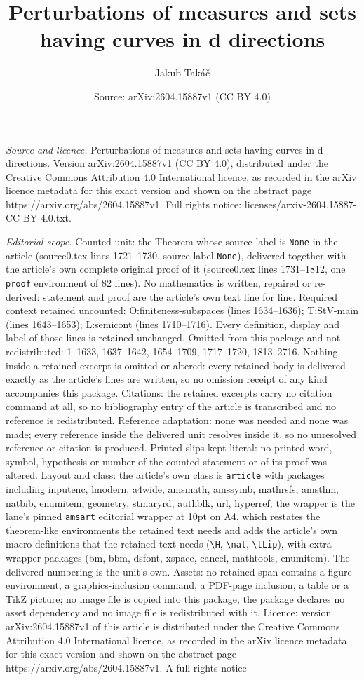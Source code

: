 \documentclass[10pt,a4paper]{amsart}
\title[Perturbations of measures and sets having curves in d direct]{Perturbations of measures and sets having curves in d directions}
\author{Jakub Tak\'a\v{c}}
\date{Source: arXiv:2604.15887v1 (CC BY 4.0)}
\begin{document}
\maketitle

\noindent\emph{Source and licence.} Perturbations of measures and sets having curves in d directions. Version arXiv:2604.15887v1 (CC BY 4.0), distributed under the Creative Commons Attribution 4.0 International licence, as recorded in the arXiv licence metadata for this exact version and shown on the abstract page https://arxiv.org/abs/2604.15887v1. Full rights notice: licenses/arxiv-2604.15887-CC-BY-4.0.txt.\par\smallskip

\noindent\textit{Editorial scope.} Counted unit: the Theorem whose source label is \texttt{None} in the article (source0.tex lines 1721--1730, source label \texttt{None}), delivered together with the article's own complete original proof of it (source0.tex lines 1731--1812, one \texttt{proof} environment of 82 lines). No mathematics is written, repaired or re-derived: statement and proof are the article's own text line for line. Required context retained uncounted: O:finiteness-subspaces (lines 1634--1636); T:StV-main (lines 1643--1653); L:semicont (lines 1710--1716). Every definition, display and label of those lines is retained unchanged. Omitted from this package and not redistributed: 1--1633, 1637--1642, 1654--1709, 1717--1720, 1813--2716. Nothing inside a retained excerpt is omitted or altered: every retained body is delivered exactly as the article's lines are written, so no omission receipt of any kind accompanies this package. Citations: the retained excerpts carry no citation command at all, so no bibliography entry of the article is transcribed and no reference is redistributed. Reference adaptation: none was needed and none was made; every reference inside the delivered unit resolves inside it, so no unresolved reference or citation is produced. Printed slips kept literal: no printed word, symbol, hypothesis or number of the counted statement or of its proof was altered. Layout and class: the article's own class is \texttt{article} with packages including inputenc, lmodern, a4wide, amsmath, amssymb, mathrsfs, amsthm, natbib, enumitem, geometry, stmaryrd, authblk, url, hyperref; the wrapper is the lane's pinned \texttt{amsart} editorial wrapper at 10pt on A4, which restates the theorem-like environments the retained text needs and adds the article's own macro definitions that the retained text needs (\texttt{\textbackslash H}, \texttt{\textbackslash nat}, \texttt{\textbackslash tLip}), with extra wrapper packages (bm, bbm, dsfont, xspace, cancel, mathtools, enumitem). The delivered numbering is the unit's own. Assets: no retained span contains a figure environment, a graphics-inclusion command, a PDF-page inclusion, a table or a TikZ picture; no image file is copied into this package, the package declares no asset dependency and no image file is redistributed with it. Licence: version arXiv:2604.15887v1 of this article is distributed under the Creative Commons Attribution 4.0 International licence, as recorded in the arXiv licence metadata for this exact version and shown on the abstract page https://arxiv.org/abs/2604.15887v1. A full rights notice 
\end{document}
